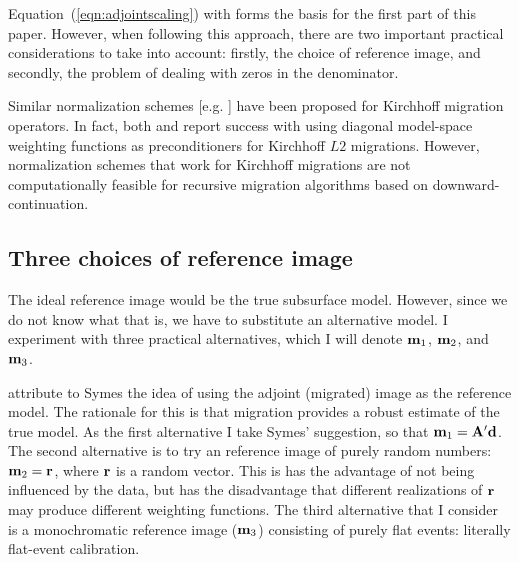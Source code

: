 \par
Equation~(\ref{eqn:adjointscaling}) with forms the basis for the first
part of this paper.
However, when following this approach, there are two 
important practical considerations to take into account:  firstly, the
choice of reference image, and secondly, the problem of dealing with
zeros in the denominator.

\par
Similar normalization schemes 
[e.g. ] 
have been proposed for Kirchhoff migration operators.  
In fact, both  and  report
success with using diagonal model-space weighting functions as
preconditioners for Kirchhoff $L2$ migrations.
However, normalization schemes that work for Kirchhoff migrations are
not computationally feasible for recursive migration algorithms based
on downward-continuation.  

\subsection{Three choices of reference image}
The ideal reference image would be the true subsurface model. 
However, since we do not know what that is, we have to substitute an
alternative model.  
I experiment with three practical alternatives, which I will denote
${\bf m}_{\rm 1}$, ${\bf m}_{\rm 2}$, and ${\bf m}_{\rm 3}$.

\par
{} attribute to
Symes the idea of using the adjoint (migrated) image as the reference
model.  The rationale for this is that migration provides a robust
estimate of the true model. 
As the first alternative I take Symes' suggestion, so that 
${\bf m}_{\rm 1}={\bf A}' {\bf d}$.  
The second alternative is to try an reference image of purely random
numbers: ${\bf m}_{\rm 2}={\bf r}$, where ${\bf r}$ is a random vector.
This is has the advantage of not being influenced by the data, but has
the disadvantage that different realizations of ${\bf r}$ may produce
different weighting functions. 
The third alternative that I consider is a monochromatic reference
image (${\bf m}_{\rm 3}$) consisting of purely flat events: 
literally flat-event calibration.

